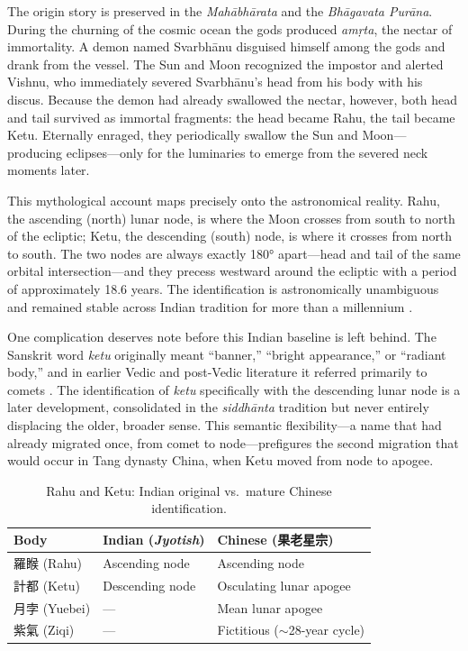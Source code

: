\documentclass[10pt,a4paper]{article}
\newcommand{\zh}[1]{#1}
\begin{document}
The origin story is preserved in the \textit{Mah\=abh\=arata} and the
\textit{Bh\=agavata Pur\=ana}.  During the churning of the cosmic ocean the gods
produced \textit{am\d{r}ta}, the nectar of immortality.  A demon named
Svarbh\=anu disguised himself among the gods and drank from the vessel.  The Sun
and Moon recognized the impostor and alerted Vishnu, who immediately severed
Svarbh\=anu's head from his body with his discus.  Because the demon had already
swallowed the nectar, however, both head and tail survived as immortal fragments:
the head became Rahu, the tail became Ketu.  Eternally enraged, they periodically
swallow the Sun and Moon---producing eclipses---only for the luminaries to emerge
from the severed neck moments later.

This mythological account maps precisely onto the astronomical reality.  Rahu,
the ascending (north) lunar node, is where the Moon crosses from south to north
of the ecliptic; Ketu, the descending (south) node, is where it crosses from
north to south.  The two nodes are always exactly 180° apart---head and tail of
the same orbital intersection---and they precess westward around the ecliptic
with a period of approximately 18.6 years.  The identification is astronomically
unambiguous and remained stable across Indian tradition for more than a millennium
\cite{pingree1981jyotih}.

One complication deserves note before this Indian baseline is left behind.  The
Sanskrit word \textit{ketu} originally meant ``banner,'' ``bright appearance,''
or ``radiant body,'' and in earlier Vedic and post-Vedic literature it referred
primarily to comets \cite[p.~47]{kotyk2018sinicization}.  The identification of
\textit{ketu} specifically with the descending lunar node is a later development,
consolidated in the \textit{siddh\=anta} tradition but never entirely displacing
the older, broader sense.  This semantic flexibility---a name that had already
migrated once, from comet to node---prefigures the second migration that would
occur in Tang dynasty China, when Ketu moved from node to apogee.

\begin{table}[ht]
\centering
\small
\caption{Rahu and Ketu: Indian original vs.\ mature Chinese identification.}
\label{tab:rahu-ketu}
\begin{tabular}{@{}lll@{}}
\toprule
Body & Indian (\textit{Jyotish}) & Chinese (\zh{果老星宗}) \\
\midrule
\zh{羅睺} (Rahu) & Ascending node & Ascending node \\
\zh{計都} (Ketu) & Descending node & Osculating lunar apogee \\
\zh{月孛} (Yuebei) & --- & Mean lunar apogee \\
\zh{紫氣} (Ziqi) & --- & Fictitious ($\sim$28-year cycle) \\
\bottomrule
\end{tabular}
\end{table}
\end{document}
